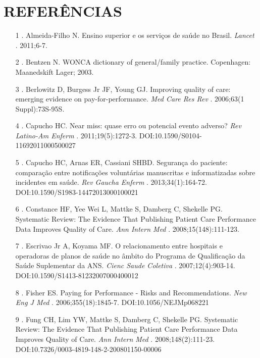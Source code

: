 \documentclass{article}
\begin{document}
\section*{REFERÊNCIAS}
\begin{itemize}

\item[1] . Almeida-Filho N. Ensino superior e os serviços de saúde no Brasil.
\textit{Lancet}
. 2011;6-7.

\item[2] . Bentzen N. WONCA dictionary of general/family practice. Copenhagen:
Maanedskift Lager; 2003.

\item[3] . Berlowitz D, Burgess Jr JF, Young GJ. Improving quality of care:
emerging
evidence on pay-for-performance. \textit{Med Care Res Rev}
. 2006;63(1
Suppl):73S-95S.

\item[4] . Capucho HC. Near miss: quase erro ou potencial evento adverso?
\textit{Rev
Latino-Am Enferm}
. 2011;19(5):1272-3.
DOI:10.1590/S0104-11692011000500027

\item[5] . Capucho HC, Arnas ER, Cassiani SHBD. Segurança do paciente:
comparação
entre notificações voluntárias manuscritas e informatizadas sobre incidentes em
saúde.
\textit{Rev Gaucha Enferm}
. 2013;34(1):164-72.
DOI:10.1590/S1983-14472013000100021

\item[6] . Constance HF, Yee Wei L, Mattke S, Damberg C, Shekelle PG. Systematic
Review: The Evidence That Publishing Patient Care Performance Data Improves
Quality of
Care. \textit{Ann Intern Med}
. 2008;15(148):111-123.

\item[7] . Escrivao Jr A, Koyama MF. O relacionamento entre hospitais e
operadoras de
planos de saúde no âmbito do Programa de Qualificação da Saúde Suplementar da
ANS.
\textit{Cienc Saude Coletiva}
. 2007;12(4):903-14.
DOI:10.1590/S1413-81232007000400012

\item[8] . Fisher ES. Paying for Performance - Risks and Recommendations.
\textit{New
Eng J Med}
. 2006;355(18):1845-7. DOI:10.1056/NEJMp068221

\item[9] . Fung CH, Lim YW, Mattke S, Damberg C, Shekelle PG. Systematic Review:
The
Evidence That Publishing Patient Care Performance Data Improves Quality of Care.
\textit{Ann Intern Med}
. 2008;148(2):111-23.
DOI:10.7326/0003-4819-148-2-200801150-00006


\end{itemize}
\end{document}
